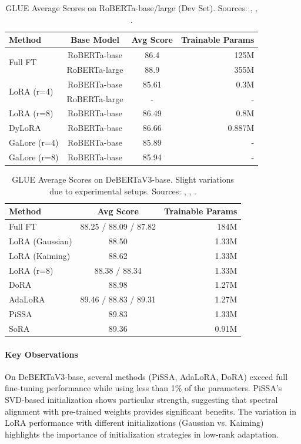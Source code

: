 \begin{table}[H]
  \centering
  \caption{GLUE Average Scores on RoBERTa-base/large (Dev Set). Sources: \cite{hu2021lora}, \cite{valipour2022dylora}, \cite{zhao2024galore}.}
  \label{tab:glue-roberta}
  \begin{tabular}{lccr}
    \toprule
    Method & Base Model & Avg Score & Trainable Params \\
    \midrule
    \multirow{2}{*}{Full FT} & RoBERTa-base & 86.4 & 125M \\
    & RoBERTa-large & 88.9 & 355M \\
    \multirow{2}{*}{LoRA (r=4)} & RoBERTa-base & 85.61 & 0.3M \\
    & RoBERTa-large & - & - \\
    LoRA (r=8) & RoBERTa-base & 86.49 & 0.8M \\
    DyLoRA & RoBERTa-base & 86.66 & 0.887M \\
    GaLore (r=4) & RoBERTa-base & 85.89 & - \\
    GaLore (r=8) & RoBERTa-base & 85.94 & - \\
    \bottomrule
  \end{tabular}
\end{table}

\begin{table}[H]
  \centering
  \caption{GLUE Average Scores on DeBERTaV3-base. Slight variations due to experimental setups. Sources: \cite{meng2024pissa}, \cite{hu2023adalora}, \cite{liu2023sora}.}
  \label{tab:glue-deberta}
  \begin{tabular}{lcr}
    \toprule
    Method & Avg Score & Trainable Params \\
    \midrule
    Full FT & 88.25 / 88.09 / 87.82 & 184M \\
    LoRA (Gaussian) & 88.50 & 1.33M \\
    LoRA (Kaiming) & 88.62 & 1.33M \\
    LoRA (r=8) & 88.38 / 88.34 & 1.33M \\
    DoRA & 88.98 & 1.27M \\
    AdaLoRA & 89.46 / 88.83 / 89.31 & 1.27M \\
    PiSSA & 89.83 & 1.33M \\
    SoRA & 89.36 & 0.91M \\
    \bottomrule
  \end{tabular}
\end{table}

\paragraph{Key Observations}
On DeBERTaV3-base, several methods (PiSSA, AdaLoRA, DoRA) exceed full fine-tuning performance while using less than 1\% of the parameters. PiSSA's SVD-based initialization shows particular strength, suggesting that spectral alignment with pre-trained weights provides significant benefits. The variation in LoRA performance with different initializations (Gaussian vs. Kaiming) highlights the importance of initialization strategies in low-rank adaptation.

